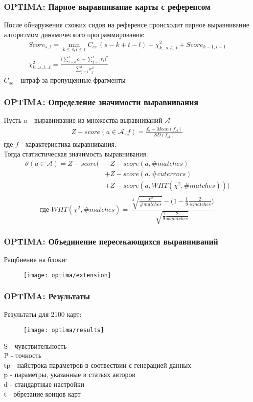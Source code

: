 \begin{frame}
\frametitle{OPTIMA: Парное выравнивание карты с референсом}
После обнаружения схожих сидов на референсе происходит парное выравнивание алгоритмом динамического программирования:
\begin{gather*}
Score_{s,t} = \min\limits_{k \le s, l \le t} C_{ce} \, (s - k + t - l) + \chi_{k \dots s, l \dots t}^2 + Score_{k-1,l-1} \\
\chi_{k \dots s, l \dots t}^2 = \frac{\bigg(\sum\limits_{i = k}^s o_i - \sum\limits_{j = l}^t r_i \bigg)^2}{\sum\limits_{j = l}^t\sigma_j^2}
\end{gather*}
$C_{se}$ - штраф за пропущенные фрагменты
\end{frame}

\begin{frame}
\frametitle{OPTIMA: Определение значимости выравнивания}
Пусть $a$ - выравнивание из множества выравниваний $\mathcal{A}$
\begin{gather*}
Z-score(a \in \mathcal{A}, f) = \frac{f_{a} - Mean(f_{\mathcal{A}})}{SD(f_{\mathcal{A}})}
\end{gather*}
где $f$ - характеристика выравнивания.\\
 Тогда статистическая значимость выравнивания:
\begin{align*}
  \vartheta (a \in \mathcal{A}) = Z-score( & -Z-score(a, \#matches) \\
  & + Z-score(a, \#cuterrors) \\
  & + Z-score(a, WHT(\chi^2, \#matches))) \\
\end{align*}
\[\text{где } WHT(\chi^2, \#matches) = \frac{\sqrt[3]{\frac{\chi^2}{\#matches}} - \big(1 - \frac{1}{9} \frac{2}{\#matches}\big)}{\sqrt{\frac{1}{9} \frac{2}{\#matches}}}\]
\end{frame}

\begin{frame}
\frametitle{OPTIMA: Объединение пересекающихся выравниваний}
Ращбиение на блоки:
\begin{figure}
  \centering
  \texttt{[image: optima/extension]}
\end{figure}
\end{frame}

\begin{frame}
\frametitle{OPTIMA: Результаты}
Результаты для 2100 карт:
\begin{figure}
  \centering
  \texttt{[image: optima/results]}
\end{figure}
S - чувствительность \\
P - точность \\
tp - найстрока параметров в соотвествии с генерацией данных \\
p - параметры, указанные в статьях авторов \\
d - стандартные настройки \\
t - обрезание концов карт \\

\end{frame}
